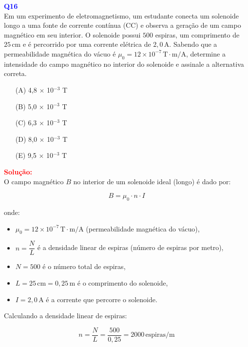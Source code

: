\documentclass[a4paper,12pt]{article}
\begin{document}
\begin{flushleft}
\textbf{\textcolor{blue}{\Large Q16}}\\
Em um experimento de eletromagnetismo, um estudante conecta um solenoide longo 
a uma fonte de corrente contínua (CC) e observa a geração de um campo magnético 
em seu interior. O solenoide possui \( 500 \) espiras, um comprimento de \( 25\,\text{cm} \) 
e é percorrido por uma corrente elétrica de \( 2{,}0\,\text{A} \). Sabendo que a 
permeabilidade magnética do vácuo é \( \mu_0 = 12 \times 10^{-7}\,\text{T} \cdot \text{m/A} \), 
determine a intensidade do campo magnético no interior do solenoide e assinale a alternativa correta.

\begin{itemize}
\item[(A)] 4,8 $\times$ 10$^{-3}$ T
\item[(B)] 5,0 $\times$ 10$^{-3}$ T
\item[(C)] 6,3 $\times$ 10$^{-3}$ T
\item[(D)] 8,0 $\times$ 10$^{-3}$ T
\item[(E)] 9,5 $\times$ 10$^{-3}$ T
\end{itemize}

\vspace{0.5cm}

\textcolor{red}{\textbf{Solução:}}\\

\colorbox{green!20}{O campo magnético \( B \) no interior de um solenoide ideal (longo) é dado por:}

\[
\boxed{
B = \mu_0 \cdot n \cdot I
}
\]

onde:
\begin{itemize}
    \item \( \mu_0 = 12 \times 10^{-7}\,\text{T} \cdot \text{m/A} \) (permeabilidade magnética do vácuo),
    \item \( n = \dfrac{N}{L} \) é a densidade linear de espiras (número de espiras por metro),
    \item \( N = 500 \) é o número total de espiras,
    \item \( L = 25\,\text{cm} = 0{,}25\,\text{m} \) é o comprimento do solenoide,
    \item \( I = 2{,}0\,\text{A} \) é a corrente que percorre o solenoide.
\end{itemize}

Calculando \colorbox{green!20}{a densidade linear de espiras:}

\[
n = \frac{N}{L} = \frac{500}{0{,}25} = 2000\,\text{espiras/m}
\]


\end{flushleft}
\end{document}
